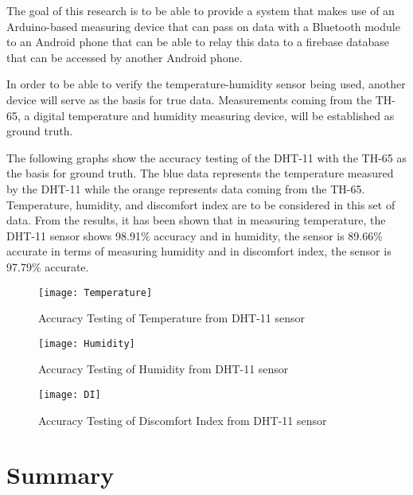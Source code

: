 The goal of this research is to be able to provide a system that makes use of an Arduino-based measuring device that can pass on data with a Bluetooth module to an Android phone that can be able to relay this data to a firebase database that can be accessed by another Android phone.

In order to be able to verify the temperature-humidity sensor being used, another device will serve as the basis for true data. Measurements coming from the TH-65, a digital temperature and humidity measuring device, will be established as ground truth.

The following graphs show the accuracy testing of the DHT-11 with the TH-65 as the basis for ground truth. The blue data represents the temperature measured by the DHT-11 while the orange represents data coming from the TH-65. Temperature, humidity, and discomfort index are to be considered in this set of data. From the results, it has been shown that in measuring temperature, the DHT-11 sensor shows 98.91\% accuracy and in humidity, the sensor is 89.66\% accurate in terms of measuring humidity and in discomfort index, the sensor is 97.79\% accurate. %

\begin{figure}[h]
\centering
\texttt{[image: Temperature]}
\caption{Accuracy Testing of Temperature from DHT-11 sensor}
\end{figure}

\begin{figure}[h]
\centering
\texttt{[image: Humidity]}
\caption{Accuracy Testing of Humidity from DHT-11 sensor}
\end{figure}

\begin{figure}[h]
\centering
\texttt{[image: DI]}
\caption{Accuracy Testing of Discomfort Index from DHT-11 sensor}
\end{figure}

\section{Summary}